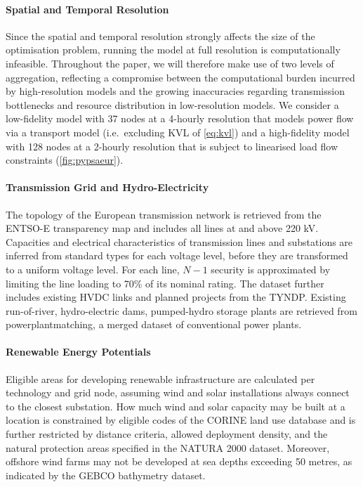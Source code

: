 \paragraph{Spatial and Temporal Resolution}
Since the spatial and temporal resolution strongly affects the size of the optimisation problem,
running the model at full resolution is computationally infeasible.
Throughout the paper, we will therefore make use of two levels of aggregation,
reflecting a compromise between the computational burden incurred by high-resolution models and
the growing inaccuracies regarding transmission bottlenecks
and resource distribution in low-resolution models.
We consider a low-fidelity model with 37 nodes at a 4-hourly resolution
that models power flow via a transport model (i.e.~excluding KVL of \cref{eq:kvl}) and
a high-fidelity model with 128 nodes at a 2-hourly resolution
that is subject to linearised load flow constraints (\cref{fig:pypsaeur}).


\paragraph{Transmission Grid and Hydro-Electricity}
The topology of the European transmission network is retrieved
from the ENTSO-E transparency map and includes all lines at and above 220 kV.
Capacities and electrical characteristics of transmission lines and substations are
inferred from standard types for each voltage level, before they are transformed to
a uniform voltage level.
For each line, $N-1$ security is approximated by limiting the line loading to 70\% of its nominal rating.
The dataset further includes existing HVDC links and planned projects from the TYNDP.
Existing run-of-river, hydro-electric dams, pumped-hydro storage plants
are retrieved from powerplantmatching, a merged dataset of conventional power plants.


\paragraph{Renewable Energy Potentials}
Eligible areas for developing renewable infrastructure are calculated
per technology and grid node, assuming wind and solar installations always connect to the closest substation. 
How much wind and solar capacity may be built at a location is constrained by
eligible codes of the CORINE land use database and is further restricted by distance criteria,
allowed deployment density, and the natural protection areas specified in the NATURA 2000 dataset.
Moreover, offshore wind farms may not be developed at sea depths exceeding 50 metres,
as indicated by the GEBCO bathymetry dataset. 

